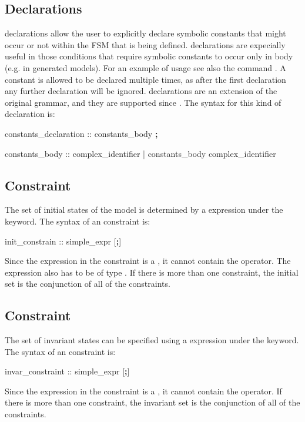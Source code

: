 \subsection{ Declarations}
\label{CONSTANTS Declarations}
%
 declarations allow the user to explicitly
declare symbolic constants that might occur or not within the FSM that
is being defined.
%
 declarations are expecially useful
in those conditions that require symbolic constants to occur only
in  body (e.g. in generated models).
For an example of usage see also the command .
%
A constant is allowed to be declared multiple times, as after the
first declaration any further declaration will be ignored.
%
 declarations are an extension of the original
\smv grammar, and they are supported since \NuSMV.
%
The syntax for this kind of declaration is:
%
\begin{Grammar}
constants_declaration ::  constants_body \textbf{;}

constants_body :: complex_identifier
             | constants_body  \operator{,} complex_identifier
\end{Grammar}


\subsection{ Constraint}
\label{INIT Constraint}
%
The set of initial states of the model is determined by a \Boolean
expression under the  keyword.
%
The syntax of an  constraint is:
%
\begin{Grammar}
init_constrain ::  simple_expr [\textbf{;}]
\end{Grammar}
%
Since the expression in the  constraint is a
, it cannot contain the 
operator.
%
The expression also has to be of type \Boolean.
%
If there is more than one  constraint, the initial set is
the conjunction of all of the  constraints.

\subsection{ Constraint}
\label{INVAR Constraint}
%
The set of invariant states can be specified using a \Boolean
expression under the  keyword.
%
The syntax of an  constraint is:
%
\begin{Grammar}
invar_constraint ::  simple_expr [\textbf{;}]
\end{Grammar}
%
Since the expression in the  constraint is a
, it cannot contain the 
operator.
%
If there is more than one  constraint, the invariant set
is the conjunction of all of the  constraints.

